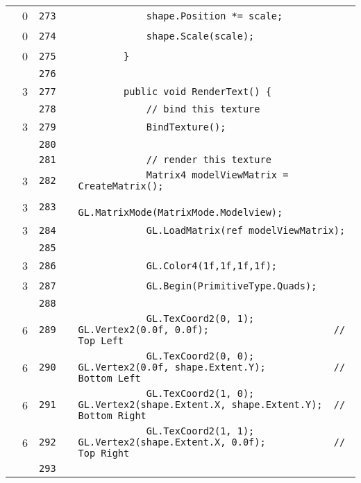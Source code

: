 \documentclass[a4paper,landscape,10pt]{article}
\begin{document}
\begin{longtable}[l]{lrrll}
\cellcolor{red} & 0 & \verb~273~ & & \verb~            shape.Position *= scale;~\\
\cellcolor{red} & 0 & \verb~274~ & & \verb~            shape.Scale(scale);~\\
\cellcolor{red} & 0 & \verb~275~ & & \verb~        }~\\
\cellcolor{gray} &  & \verb~276~ & & \verb~~\\
\cellcolor{green} & 3 & \verb~277~ & & \verb~        public void RenderText() {~\\
\cellcolor{gray} &  & \verb~278~ & & \verb~            // bind this texture~\\
\cellcolor{green} & 3 & \verb~279~ & & \verb~            BindTexture();~\\
\cellcolor{gray} &  & \verb~280~ & & \verb~~\\
\cellcolor{gray} &  & \verb~281~ & & \verb~            // render this texture~\\
\cellcolor{green} & 3 & \verb~282~ & & \verb~            Matrix4 modelViewMatrix = CreateMatrix();~\\
\cellcolor{green} & 3 & \verb~283~ & & \verb~            GL.MatrixMode(MatrixMode.Modelview);~\\
\cellcolor{green} & 3 & \verb~284~ & & \verb~            GL.LoadMatrix(ref modelViewMatrix);~\\
\cellcolor{gray} &  & \verb~285~ & & \verb~~\\
\cellcolor{green} & 3 & \verb~286~ & & \verb~            GL.Color4(1f,1f,1f,1f);~\\
\cellcolor{green} & 3 & \verb~287~ & & \verb~            GL.Begin(PrimitiveType.Quads);~\\
\cellcolor{gray} &  & \verb~288~ & & \verb~~\\
\cellcolor{green} & 6 & \verb~289~ & & \verb~            GL.TexCoord2(0, 1); GL.Vertex2(0.0f, 0.0f);                      // Top Left~\\
\cellcolor{green} & 6 & \verb~290~ & & \verb~            GL.TexCoord2(0, 0); GL.Vertex2(0.0f, shape.Extent.Y);            // Bottom Left~\\
\cellcolor{green} & 6 & \verb~291~ & & \verb~            GL.TexCoord2(1, 0); GL.Vertex2(shape.Extent.X, shape.Extent.Y);  // Bottom Right~\\
\cellcolor{green} & 6 & \verb~292~ & & \verb~            GL.TexCoord2(1, 1); GL.Vertex2(shape.Extent.X, 0.0f);            // Top Right~\\
\cellcolor{gray} &  & \verb~293~ & & \verb~~\\

\end{longtable}
\end{document}
